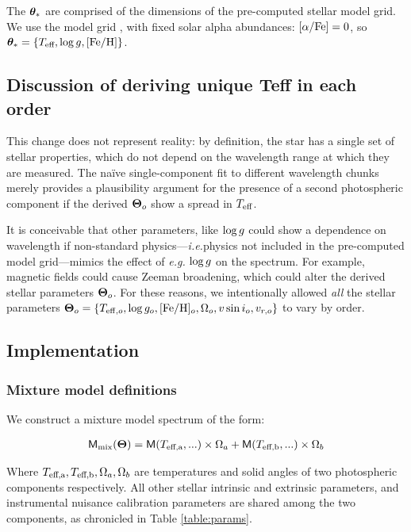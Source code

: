 \documentclass[twocolumn]{emulateapj}%
\begin{document}
The ${\bm \theta}_{\ast}$ are comprised of the dimensions of the pre-computed stellar model grid.  We use the \PHOENIX model grid \citep{husser13}, with fixed solar alpha abundances: $[\alpha/{\rm Fe}] = 0$, so ${\bm \theta}_{\ast} = \{T_\textrm{eff}, \log g, [{\rm Fe}/{\rm H}] \}$.


\subsection{Discussion of deriving unique Teff in each order}
\label{sec:approach12}


This change does not represent reality: by definition, the star has a single set of stellar properties, which do not depend on the wavelength range at which they are measured.  The na\"ive single-component fit to different wavelength chunks merely provides a plausibility argument for the presence of a second photospheric component if the derived ${\bm \Theta}_o$ show a spread in $T_\textrm{eff}$.  

It is conceivable that other parameters, like $\log g$ could show a dependence on wavelength if non-standard physics---\emph{i.e.}physics not included in the pre-computed model grid---mimics the effect of \emph{e.g.} $\log g$ on the spectrum.  For example, magnetic fields could cause Zeeman broadening, which could alter the derived stellar parameters ${\bm \Theta}_o$.  For these reasons, we intentionally allowed \emph{all} the stellar parameters ${\bm \Theta}_o = \{T_{\mathrm{eff},o}, \log{g_o}, [{\rm Fe}/{\rm H}]_o, \Omega_{o}, v\sin{i}_o, v_{r,o}\}$ to vary by order.  


\subsection{Implementation}

\subsubsection{Mixture model definitions}

We construct a mixture model spectrum of the form:

\begin{eqnarray} \label{eqn:mix_M}
\mathsf{M}_{\mathrm{mix}}({\bm \Theta}) = \mathsf{M}(T_\textrm{eff,a}, ...) \times \Omega_a + \mathsf{M}(T_\textrm{eff,b}, ...) \times \Omega_b
\end{eqnarray}


Where $T_\textrm{eff,a}, T_\textrm{eff,b}, \Omega_a, \Omega_b$ are temperatures and solid angles of two photospheric components respectively.  All other stellar intrinsic and extrinsic parameters, and instrumental nuisance calibration parameters are shared among the two components, as chronicled in Table \ref{table:params}.
\end{document}
